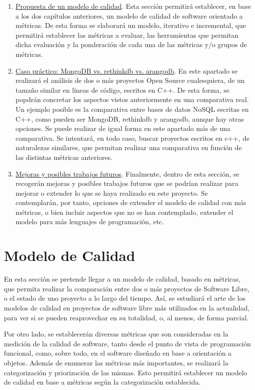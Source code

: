 \documentclass[11pt]{article}
\begin{document}
\begin{enumerate}
\item{\underline{Propuesta de un modelo de calidad}}. Esta sección permitirá establecer, en base a los dos capítulos anteriores, un modelo de calidad de software orientado a métricas. De esta forma se elaborará un modelo, iterativo e incremental, que permitirá establecer las métricas a evaluar, las herramientas que permitan dicha evaluación y la ponderación de cada una de las métricas y/o grupos de métricas.
\item{\underline{Caso práctico: MongoDB vs. rethinkdb vs. arangodb}}. En este apartado se realizará el análisis de dos o más proyectos Open Source cualesquiera, de un tamaño similar en líneas de código, escritos en C++. De esta forma, se popdrán concretar los aspectos vistos anteriormente en una comparativa real.
Un ejemplo posible es la comparativa entre bases de datos NoSQL escritas en C++, como pueden ser MongoDB, rethinkdb y arangodb, aunque hay otras opciones. Se puede realizar de igual forma en este apartado más de una comparativa. Se intentará, en todo caso, buscar proyectos escritos en c++, de naturalezas similares, que permitan realizar una comparativa en función de las distintas métricas anteriores.
\item{\underline{Mejoras y posibles trabajos futuros}}. Finalmente, dentro de esta sección, se recogerán mejoras y posibles trabajos futuros que se podrían realizar para mejorar o extender lo que se haya realizado en este proyecto. Se contemplarán, por tanto, opciones de extender el modelo de calidad con más métricas, o bien incluir aspectos que no se han contemplado, extender el modelo para más lenguajes de programación, etc.
\end{enumerate}

\section{Modelo de Calidad}
En esta sección se pretende llegar a un modelo de calidad, basado en métricas, que permita realizar la comparación entre dos o más proyectos de Software Libre, o el estado de uno proyecto a lo largo del tiempo. Así, se estudiará el arte de los modelos de calidad en proyectos de software libre más utilizados en la actualidad, para ver si se pueden reaprovechar en su totalidad, o, al menos, de forma parcial.

Por otro lado, se establecerán diversas métricas que son consideradas en la medición de la calidad de software, tanto desde el punto de vista de programación funcional, como, sobre todo, en el software diseñado en base a orientación a objetos. Además de enumerar las métricas más importantes, se realizará la categorización y priorización de las mismas. Esto permitirá establecer un modelo de calidad en base a métricas según la categorización establecida.
\end{document}
